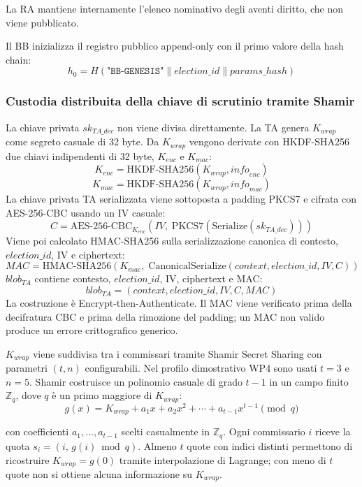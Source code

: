 \documentclass[12pt,a4paper]{article}
\newcommand{\sk}{\mathit{sk}}
\begin{document}
La RA mantiene internamente l'elenco nominativo degli aventi diritto, che non viene pubblicato.

Il BB inizializza il registro pubblico append-only con il primo valore della hash chain:
\[
h_0 = H(\texttt{"BB-GENESIS"} \| \mathit{election\_id} \| \mathit{params\_hash})
\]

\subsubsection*{Custodia distribuita della chiave di scrutinio tramite Shamir}

La chiave privata $\sk_{\mathit{TA\_dec}}$ non viene divisa direttamente. La TA genera $K_{\mathit{wrap}}$ come segreto casuale di 32 byte. Da $K_{\mathit{wrap}}$ vengono derivate con HKDF-SHA256 due chiavi indipendenti di 32 byte, $K_{\mathit{enc}}$ e $K_{\mathit{mac}}$:
\[
K_{\mathit{enc}}
=
\mathrm{HKDF\mbox{-}SHA256}
(K_{\mathit{wrap}},\mathit{info}_{\mathit{enc}})
\]
\[
K_{\mathit{mac}}
=
\mathrm{HKDF\mbox{-}SHA256}
(K_{\mathit{wrap}},\mathit{info}_{\mathit{mac}})
\]
La chiave privata TA serializzata viene sottoposta a padding PKCS7 e cifrata con AES-256-CBC usando un IV casuale:
\[
C = \mathrm{AES\mbox{-}256\mbox{-}CBC}_{K_{\mathit{enc}}}(\mathit{IV},\; \mathrm{PKCS7}(\mathrm{Serialize}(\sk_{\mathit{TA\_dec}})))
\]
Viene poi calcolato HMAC-SHA256 sulla serializzazione canonica di contesto, $\mathit{election\_id}$, IV e ciphertext:
\[
\mathit{MAC} = \mathrm{HMAC\mbox{-}SHA256}(K_{\mathit{mac}},\; \mathrm{CanonicalSerialize}(\mathit{context}, \mathit{election\_id}, \mathit{IV}, C))
\]
$\mathit{blob}_{\mathit{TA}}$ contiene contesto, $\mathit{election\_id}$, IV, ciphertext e MAC:
\[
\mathit{blob}_{\mathit{TA}} = (\mathit{context}, \mathit{election\_id}, \mathit{IV}, C, \mathit{MAC})
\]
La costruzione \`e Encrypt-then-Authenticate. Il MAC viene verificato prima della decifratura CBC e prima della rimozione del padding; un MAC non valido produce un errore crittografico generico.

$K_{\mathit{wrap}}$ viene suddivisa tra i commissari tramite Shamir Secret Sharing con parametri $(t, n)$ configurabili. Nel profilo dimostrativo WP4 sono usati $t = 3$ e $n = 5$. Shamir costruisce un polinomio casuale di grado $t-1$ in un campo finito $\mathbb{Z}_q$, dove $q$ \`e un primo maggiore di $K_{\mathit{wrap}}$:
\[
g(x) = K_{\mathit{wrap}} + a_1 x + a_2 x^2 + \cdots + a_{t-1} x^{t-1} \pmod{q}
\]

con coefficienti $a_1, \ldots, a_{t-1}$ scelti casualmente in $\mathbb{Z}_q$. Ogni commissario $i$ riceve la quota $s_i = (i,\, g(i) \bmod q)$. Almeno $t$ quote con indici distinti permettono di ricostruire $K_{\mathit{wrap}} = g(0)$ tramite interpolazione di Lagrange; con meno di $t$ quote non si ottiene alcuna informazione su $K_{\mathit{wrap}}$.
\end{document}
